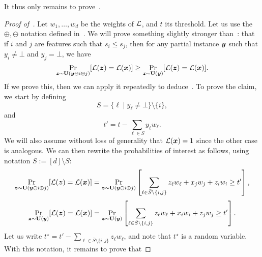 It thus only remains to prove~.
\begin{proof}[Proof of~]
Let $w_1, \ldots, w_d$ be the weights of $\mathcal{L}$, and $t$ its threshold. Let us use the $\oplus, \ominus$ notation defined in~. 
   We will prove something slightly stronger than~: that if $i$ and $j$ are features such that $s_i \leq s_j$, then for any partial instance ${\bm{y}}$ such that $y_i \neq \bot$ and $y_j = \bot$, we have
    \[
        \Pr_{{\bm{z}} \sim \mathbf{U}({\bm{y}} \ominus i \oplus j)}[\mathcal{L}({\bm{z}}) = \mathcal{L}({\bm{x}})] \geq \Pr_{{\bm{z}} \sim \mathbf{U}({\bm{y}})}[\mathcal{L}({\bm{z}}) = \mathcal{L}({\bm{x}})].
    \]
    If we prove this, then we can apply it repeatedly to deduce~. To prove the claim, we start by defining
    \[ 
        S = \{ \ell \mid y_\ell \neq \bot \} \setminus \{i \},
    \]
    and 
    \[ 
        t' = t - \sum_{\ell \in S} y_\ell w_\ell.
    \]
   We will also assume without loss of generality that $\mathcal{L}({\bm{x}}) = 1$ since the other case is analogous. We can then rewrite the probabilities of interest as follows, using notation $\bar{S} := [d] \setminus S$:
   \[
    \Pr_{{\bm{z}} \sim \mathbf{U}({\bm{y}} \ominus i \oplus j)}[\mathcal{L}({\bm{z}}) = \mathcal{L}({\bm{x}})] = \Pr_{{\bm{z}} \sim \mathbf{U}({\bm{y}} \ominus i \oplus j)}\left[\sum_{\ell \in \bar{S} \setminus \{i, j\}} z_\ell w_\ell  + x_j w_j + z_i w_i\geq t'\right],
   \]
   \[
    \Pr_{{\bm{z}} \sim \mathbf{U}({\bm{y}})}[\mathcal{L}({\bm{z}}) = \mathcal{L}({\bm{x}})] = \Pr_{{\bm{z}} \sim \mathbf{U}({\bm{y}})}\left[\sum_{\ell \in \bar{S} \setminus \{i, j\}} z_\ell w_\ell  + x_i w_i + z_j w_j\geq t'\right].
   \]
    Let us write $t^\star = t' - \sum_{\ell \in \bar{S} \setminus \{i, j\}} z_\ell w_\ell$, and note that $t^\star$ is a random variable. With this notation, it remains to prove that 


\end{proof}
